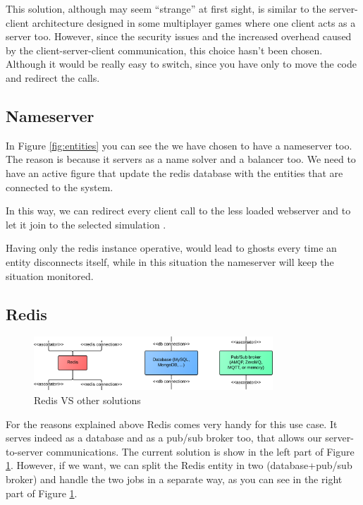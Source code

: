 This solution, although may seem ``strange'' at first sight, is similar to the server-client architecture designed in some multiplayer games where one client acts as a server too. However, since the security issues and the increased overhead caused by the client-server-client communication, this choice hasn't been chosen. Although it would be really easy to switch, since you have only to move the code and redirect the calls.

\subsection{Nameserver}

In Figure \ref{fig:entities} you can see the we have chosen to have a nameserver too. The reason is because it servers as a name solver and a balancer too. We need to have an active figure that update the redis database with the entities that are connected to the system.

In this way, we can redirect every client call to the less loaded webserver and to let it join to the selected simulation .

Having only the redis instance operative, would lead to ghosts every time an entity disconnects itself, while in this situation the nameserver will keep the situation monitored.

\subsection{Redis}

\begin{figure}[H]
\centering %
\includegraphics[width=0.8\textwidth]{./img/SystemAnalysis/RedisPubSubBroker.png}
\caption{Redis VS other solutions}
\label{fig:redisVSotherSolutions}
\end{figure}

For the reasons explained above Redis comes very handy for this use case. It serves indeed as a database and as a pub/sub broker too, that allows our server-to-server communications. The current solution is show in the left part of Figure \ref{fig:redisVSotherSolutions}. However, if we want, we can split the Redis entity in two (database+pub/sub broker) and handle the two jobs in a separate way, as you can see in the right part of Figure \ref{fig:redisVSotherSolutions}.

